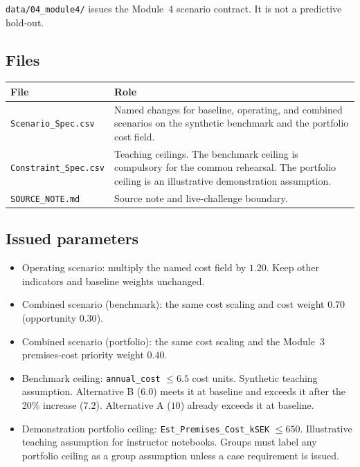 \documentclass[11pt,a4paper]{article}
\begin{document}
\texttt{data/04\_module4/} issues the Module~4 scenario contract.
It is not a predictive hold-out.

\subsection{Files}

\begin{center}
\small
\begin{tabularx}{\textwidth}{@{}p{}X@{}}
\toprule
File & Role \\
\midrule
\texttt{Scenario\_Spec.csv} &
Named changes for baseline, operating, and combined scenarios
on the synthetic benchmark and the portfolio cost field. \\[0.4em]
\texttt{Constraint\_Spec.csv} &
Teaching ceilings. The benchmark ceiling is compulsory for the
common rehearsal. The portfolio ceiling is an illustrative
demonstration assumption. \\[0.4em]
\texttt{SOURCE\_NOTE.md} &
Source note and live-challenge boundary. \\
\bottomrule
\end{tabularx}
\end{center}

\subsection{Issued parameters}

\begin{itemize}
    \item Operating scenario: multiply the named cost field by $1.20$.
    Keep other indicators and baseline weights unchanged.
    \item Combined scenario (benchmark): the same cost scaling and
    cost weight $0.70$ (opportunity $0.30$).
    \item Combined scenario (portfolio): the same cost scaling and
    the Module~3 premises-cost priority weight $0.40$.
    \item Benchmark ceiling: \texttt{annual\_cost} $\le 6.5$ cost units.
    Synthetic teaching assumption. Alternative B ($6.0$) meets it at
    baseline and exceeds it after the 20\% increase ($7.2$).
    Alternative A ($10$) already exceeds it at baseline.
    \item Demonstration portfolio ceiling:
    \texttt{Est\_Premises\_Cost\_kSEK} $\le 650$.
    Illustrative teaching assumption for instructor notebooks.
    Groups must label any portfolio ceiling as a group assumption
    unless a case requirement is issued.
\end{itemize}
\end{document}
